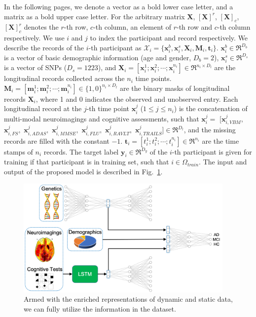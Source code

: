 In the following pages, we denote a vector as a bold lower case letter, and a matrix as a bold upper case letter. For the arbitrary matrix $\mathbf{X}$, $[\mathbf{X}]^r$, $[\mathbf{X}]_c$, $[\mathbf{X}]^r_c$ denotes the $r$-th row, $c$-th column, an element of $r$-th row and $c$-th column respectively. We use $i$ and $j$ to index the participant and record respectively. We describe the records of the $i$-th participant as $\mathcal{X}_i = \{\mathbf{x}_i^b, \mathbf{x}_i^s, \mathbf{X}_i, \mathbf{M}_i, \mathbf{t}_i\}$. $\mathbf{x}_i^b \in \Re^{D_b}$ is a vector of basic demographic information (age and gender, $D_b = 2$), $\mathbf{x}_i^s \in \Re^{D_s}$ is a vector of SNPs ($D_s = 1223$), and $\mathbf{X}_i = [\mathbf{x}_i^1; \mathbf{x}_i^2; \cdots; \mathbf{x}_i^{n_i}] \in \Re^{n_i \times D_l}$ are the longitudinal records collected across the $n_i$ time points. $\mathbf{M}_i = [\mathbf{m}_i^1; \mathbf{m}_i^2; \cdots; \mathbf{m}_i^{n_i}] \in \{1, 0\}^{n_i \times D_l}$ are the binary masks of longitudinal records $\mathbf{X}_i$, where 1 and 0 indicates the observed and unobserved entry. Each longitudinal record at the $j$-th time point $\mathbf{x}_i^j$ ($1 \leq j \leq n_i$) is the concatenation of multi-modal neuroimagings and cognitive assessments, such that $\mathbf{x}_i^j = $ $[\mathbf{x}_{i,VBM}^j$, $\mathbf{x}_{i,FS}^j,$ $\mathbf{x}_{i,ADAS}^j,$ $\mathbf{x}_{i,MMSE}^j,$ $\mathbf{x}_{i,FLU}^j,$ $\mathbf{x}_{i,RAVLT}^j,$ $\mathbf{x}_{i,TRAILS}^j] \in \Re^{D_l}$, and the missing records are filled with the constant $-1$. $\mathbf{t}_i = [t_i^1; t_i^2; \cdots; t_i^{n_i}] \in \Re^{n_i}$ are the time stamps of $n_i$ records. The target label $\mathbf{y}_i \in \Re^{D_y}$ of the $i$-th participant is given for training if that participant is in training set, such that $i \in \Omega_{train}$. 
The input and output of the proposed model is described in Fig.~\ref{fig: final-inputs}.
\begin{figure}
    \centering
    \includegraphics[width=0.95\textwidth]{images/final-inputs.png}
    \caption{Armed with the enriched representations of dynamic and static data, we can fully utilize the information in the dataset. 
    } \label{fig: final-inputs}
\end{figure}

